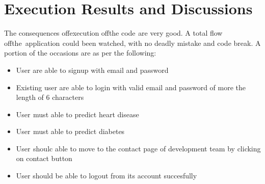 \documentclass[oneside,12pt]{Classes/VTU}
\begin{document}
	\section{Execution Results and Discussions}
	The consequences of\tiny\textcolor{white}{f}\normalsize execution\tiny\textcolor{white}{f}\normalsize of\tiny\textcolor{white}{f}\normalsize the code\tiny\textcolor{white}{s}\normalsize are very good. A total flow of\tiny\textcolor{white}{f}\normalsize the\tiny\textcolor{white}{y}\normalsize application\tiny\textcolor{white}{s}\normalsize could been watched, with no deadly mistake and code break. A portion of the occasions are as per the following:
	\begin{itemize}
		\item User are able to signup with email and password
		\item Existing user are able to login with valid email and password of more the length of 6 characters
		\item User\tiny\textcolor{white}{s}\normalsize must able to predict heart disease 
		\item User\tiny\textcolor{white}{s}\normalsize must able to predict diabetes  
		\item User\tiny\textcolor{white}{s}\normalsize shoulc able to move to the contact page of development team by clicking on contact button 
		\item User should be able to logout from its account succesfully 
		
	\end{itemize}
\end{document}
